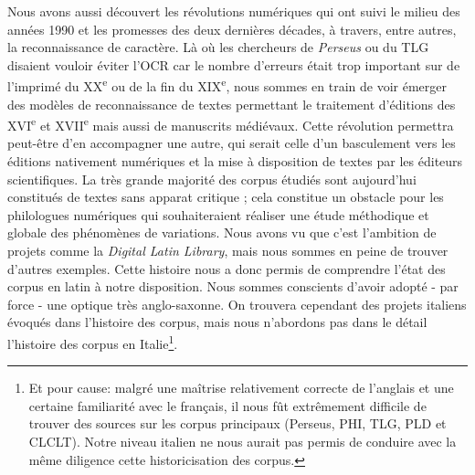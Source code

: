 Nous avons aussi découvert les révolutions numériques qui ont suivi le milieu des années 1990 et les promesses des deux dernières décades, à travers, entre autres, la reconnaissance de caractère. Là où les chercheurs de \textit{Perseus} ou du TLG disaient vouloir éviter l'OCR car le nombre d'erreurs était trop important sur de l'imprimé du XX\textsuperscript{e} ou de la fin du XIX\textsuperscript{e}, nous sommes en train de voir émerger des modèles de reconnaissance de textes permettant le traitement d'éditions des XVI\textsuperscript{e} et XVII\textsuperscript{e} mais aussi de manuscrits médiévaux. Cette révolution permettra peut-être d'en accompagner une autre, qui serait celle d'un basculement vers les éditions nativement numériques et la mise à disposition de textes par les éditeurs scientifiques. La très grande majorité des corpus étudiés sont aujourd'hui constitués de textes sans apparat critique ; cela constitue un obstacle pour les philologues numériques qui souhaiteraient réaliser une étude méthodique et globale des phénomènes de variations. Nous avons vu que c'est l'ambition de projets comme la \textit{Digital Latin Library}, mais nous sommes en peine de trouver d'autres exemples. Cette histoire nous a donc permis de comprendre l'état des corpus en latin à notre disposition. Nous sommes conscients d'avoir adopté - par force - une optique très anglo-saxonne. On trouvera cependant des projets italiens évoqués dans l'histoire des corpus, mais nous n'abordons pas dans le détail l'histoire des corpus en Italie\footnote{Et pour cause: malgré une maîtrise relativement correcte de l'anglais et une certaine familiarité avec le français, il nous fût extrêmement difficile de trouver des sources sur les corpus principaux (Perseus, PHI, TLG, PLD et CLCLT). Notre niveau italien ne nous aurait pas permis de conduire avec la même diligence cette historicisation des corpus.}.

